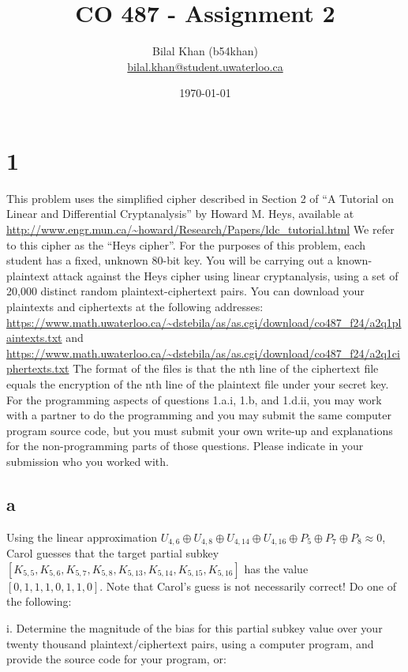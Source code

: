 \documentclass[11pt]{article}
\title{CO 487 - Assignment 2}
\author{Bilal Khan (b54khan)\\
\href{mailto:bilal.khan@student.uwaterloo.ca}{bilal.khan@student.uwaterloo.ca}}
\date{\today}
\begin{document}
\maketitle

\tableofcontents

\section{1}

This problem uses the simpliﬁed cipher described in Section 2 of “A Tutorial on Linear and Diﬀerential Cryptanalysis” by Howard M. Heys, available at \url{http://www.engr.mun.ca/~howard/Research/Papers/ldc_tutorial.html}
We refer to this cipher as the “Heys cipher”. For the purposes of this problem, each student has a ﬁxed, unknown 80-bit key.
You will be carrying out a known-plaintext attack against the Heys cipher using linear cryptanalysis, using a set of 20,000 distinct random plaintext-ciphertext pairs.
You can download your plaintexts and ciphertexts at the following addresses:
\url{https://www.math.uwaterloo.ca/~dstebila/as/as.cgi/download/co487_f24/a2q1plaintexts.txt}
and
\url{https://www.math.uwaterloo.ca/~dstebila/as/as.cgi/download/co487_f24/a2q1ciphertexts.txt}
The format of the ﬁles is that the nth line of the ciphertext ﬁle equals the encryption of the nth line of the plaintext ﬁle under your secret key.
For the programming aspects of questions 1.a.i, 1.b, and 1.d.ii, you may work with a partner to do the programming and you may submit the same computer program source code, but you must submit your own write-up and explanations for the non-programming parts of those questions.
Please indicate in your submission who you worked with.

\subsection{a}

Using the linear approximation $U_{4,6} \oplus U_{4,8} \oplus U_{4,14} \oplus U_{4,16} \oplus P_{5} \oplus P_{7} \oplus P_{8} \approx 0$, Carol guesses that the target partial subkey $[K_{5,5}, K_{5,6}, K_{5,7}, K_{5,8}, K_{5,13}, K_{5,14}, K_{5,15}, K_{5,16}]$ has the value $[0, 1, 1, 1, 0, 1, 1, 0]$. Note that Carol's guess is not necessarily correct! Do one of the following:

i. Determine the magnitude of the bias for this partial subkey value over your twenty thousand plaintext/ciphertext pairs, using a computer program, and provide the source code for your program, or:
\end{document}
